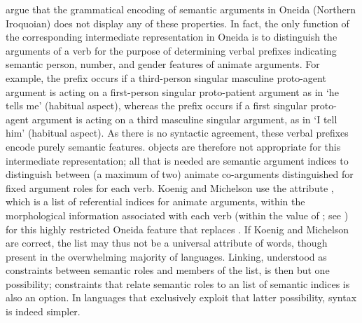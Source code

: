 \documentclass[output=paper
                ,modfonts
                ,nonflat
	        ,collection
	        ,collectionchapter
	        ,collectiontoclongg
 	        ,biblatex
                ,babelshorthands
                ,newtxmath
                ,draftmode
                ,colorlinks, citecolor=brown
]{./langsci/langscibook}
\begin{document}
\citet{KoenigandMichelson2014,KoenigandMichelson2015a,KoenigandMichelson2015b} argue that the grammatical encoding of semantic arguments in Oneida (Northern Iroquoian)  does not display any of these properties.  In fact, the only function of the
corresponding intermediate representation in Oneida is to distinguish
the arguments of a verb for the purpose of determining verbal
prefixes indicating semantic person, number, and gender
features of animate arguments.  
For example,  the prefix  occurs if a third-person singular masculine proto-agent argument is acting on a first-person singular proto-patient argument as in   `he tells me’ (habitual aspect), whereas  the prefix  occurs if a first singular proto-agent argument is acting on a third masculine singular argument, as in  `I tell him’ (habitual aspect).
 As there is no syntactic agreement, these verbal prefixes encode purely semantic features.
 objects are therefore not appropriate for this intermediate
representation; all that is needed are semantic argument indices to
distinguish between (a maximum of two) animate co-arguments
distinguished for fixed argument roles for each verb.
Koenig and Michelson use the attribute , which is a list of referential indices for animate arguments, within the morphological information associated with each verb (within the value of ; see ) for this highly restricted
Oneida feature that replaces \argst. If Koenig and Michelson are correct, the \argst list may thus not be a universal attribute of words, though present in the overwhelming majority of languages.
Linking, understood as constraints between semantic roles and members of the \argst list, is then but one possibility; constraints that relate semantic roles to an  list of semantic indices is also an option.
In languages that exclusively exploit that latter possibility, syntax is indeed simpler.
\end{document}
